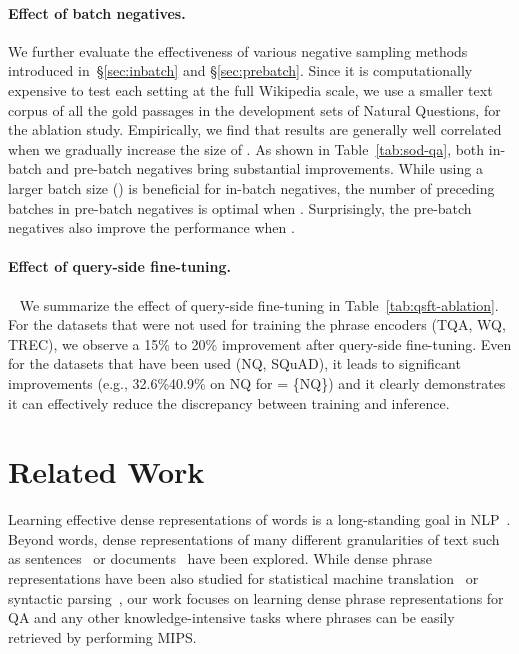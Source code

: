 \documentclass[11pt,a4paper]{article}
\begin{document}
\begin{comment}
\end{comment}
 
\paragraph{Effect of batch negatives.}\label{sec:semi_od}
We further evaluate the effectiveness of various negative sampling methods introduced in~\S\ref{sec:inbatch} and \S\ref{sec:prebatch}.
Since it is computationally expensive to test each setting at the full Wikipedia scale, we use a smaller text corpus  of all the gold passages in the development sets of Natural Questions, for the ablation study.
Empirically, we find that results are generally well correlated when we gradually increase the size of .
As shown in Table~\ref{tab:sod-qa}, both in-batch and pre-batch negatives bring substantial improvements.
While using a larger batch size () is beneficial for in-batch negatives, the number of preceding batches in pre-batch negatives is optimal when .
Surprisingly, the pre-batch negatives also improve the performance when .



\paragraph{Effect of query-side fine-tuning.}~\label{sec:qsft-ablation}
We summarize the effect of query-side fine-tuning in Table~\ref{tab:qsft-ablation}.
For the datasets that were not used for training the phrase encoders (TQA, WQ, TREC), we observe a 15\% to 20\% improvement after query-side fine-tuning. Even for the datasets that have been used (NQ, SQuAD), it leads to significant improvements (e.g., 32.6\%40.9\% on NQ for  = \{NQ\}) and it clearly demonstrates it can effectively reduce the discrepancy between training and inference.

 

\section{Related Work}
\label{sec:related_work}

Learning effective dense representations of words is a long-standing goal in NLP~\citep{bengio2003neural,collobert2011natural,mikolov2013distributed,peters2018deep,devlin2019bert}.
Beyond words, dense representations of many different granularities of text such as sentences~\citep{le2014distributed,kiros2015skip} or documents~\citep{yih2011learning} have been explored.
While dense phrase representations have been also studied for statistical machine translation~\citep{cho2014learning} or syntactic parsing~\citep{socher2010learning}, our work focuses on learning dense phrase representations for QA and any other knowledge-intensive tasks where phrases can be easily retrieved by performing MIPS.
\end{document}
